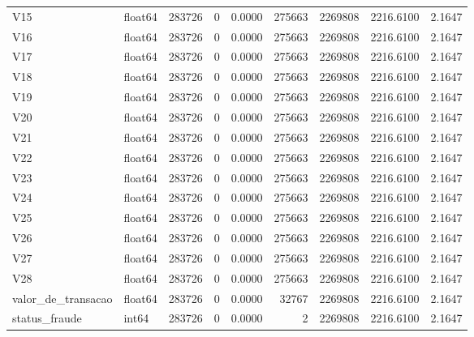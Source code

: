\begin{longtable}{llrrlrrll}
V15 & float64 & 283726 & 0 & 0.0000 & 275663 & 2269808 & 2216.6100 & 2.1647 \\
V16 & float64 & 283726 & 0 & 0.0000 & 275663 & 2269808 & 2216.6100 & 2.1647 \\
V17 & float64 & 283726 & 0 & 0.0000 & 275663 & 2269808 & 2216.6100 & 2.1647 \\
V18 & float64 & 283726 & 0 & 0.0000 & 275663 & 2269808 & 2216.6100 & 2.1647 \\
V19 & float64 & 283726 & 0 & 0.0000 & 275663 & 2269808 & 2216.6100 & 2.1647 \\
V20 & float64 & 283726 & 0 & 0.0000 & 275663 & 2269808 & 2216.6100 & 2.1647 \\
V21 & float64 & 283726 & 0 & 0.0000 & 275663 & 2269808 & 2216.6100 & 2.1647 \\
V22 & float64 & 283726 & 0 & 0.0000 & 275663 & 2269808 & 2216.6100 & 2.1647 \\
V23 & float64 & 283726 & 0 & 0.0000 & 275663 & 2269808 & 2216.6100 & 2.1647 \\
V24 & float64 & 283726 & 0 & 0.0000 & 275663 & 2269808 & 2216.6100 & 2.1647 \\
V25 & float64 & 283726 & 0 & 0.0000 & 275663 & 2269808 & 2216.6100 & 2.1647 \\
V26 & float64 & 283726 & 0 & 0.0000 & 275663 & 2269808 & 2216.6100 & 2.1647 \\
V27 & float64 & 283726 & 0 & 0.0000 & 275663 & 2269808 & 2216.6100 & 2.1647 \\
V28 & float64 & 283726 & 0 & 0.0000 & 275663 & 2269808 & 2216.6100 & 2.1647 \\
valor\_de\_transacao & float64 & 283726 & 0 & 0.0000 & 32767 & 2269808 & 2216.6100 & 2.1647 \\
status\_fraude & int64 & 283726 & 0 & 0.0000 & 2 & 2269808 & 2216.6100 & 2.1647 \\
\end{longtable}
